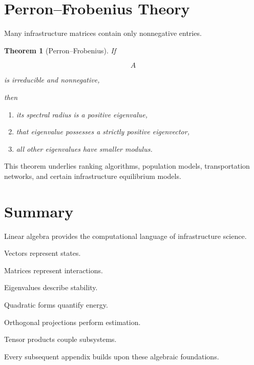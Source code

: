 \documentclass[11pt,fleqn]{book}
\numberwithin{equation}{chapter}
\theoremstyle{plain}
\newtheorem{theorem}{Theorem}[chapter]
\theoremstyle{definition}
\theoremstyle{remark}
\begin{document}

\section{Perron--Frobenius Theory}

Many infrastructure matrices contain only nonnegative entries.


\begin{theorem}[Perron--Frobenius]

If

\[
A
\]

is irreducible and nonnegative,

then

\begin{enumerate}
\item
its spectral radius is a positive eigenvalue,

\item
that eigenvalue possesses a strictly positive eigenvector,

\item
all other eigenvalues have smaller modulus.
\end{enumerate}

\end{theorem}

This theorem underlies ranking algorithms, population models,
transportation networks, and certain infrastructure equilibrium models.


\section{Summary}

Linear algebra provides the computational language of infrastructure
science.

Vectors represent states.

Matrices represent interactions.

Eigenvalues describe stability.

Quadratic forms quantify energy.

Orthogonal projections perform estimation.

Tensor products couple subsystems.

Every subsequent appendix builds upon these algebraic foundations.
\end{document}
